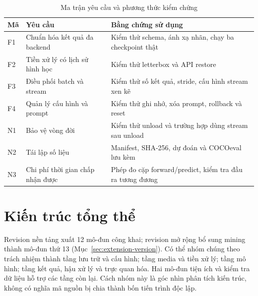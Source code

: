 \begin{table}[H]\centering\small
\caption{Ma trận yêu cầu và phương thức kiểm chứng}
\begin{tabularx}{\textwidth}{p{1.3cm}YY}
\toprule Mã & Yêu cầu & Bằng chứng sử dụng \\\midrule
F1 & Chuẩn hóa kết quả đa backend & Kiểm thử schema, ánh xạ nhãn, chạy ba checkpoint thật \\
F2 & Tiền xử lý có lịch sử hình học & Kiểm thử letterbox và API restore \\
F3 & Điều phối batch và stream & Kiểm thử số kết quả, stride, cấu hình stream xen kẽ \\
F4 & Quản lý cấu hình và prompt & Kiểm thử ghi nhớ, xóa prompt, rollback và reset \\
N1 & Bảo vệ vòng đời & Kiểm thử unload và trường hợp dùng stream sau unload \\
N2 & Tái lập số liệu & Manifest, SHA-256, dự đoán và COCOeval lưu kèm \\
N3 & Chi phí thời gian chấp nhận được & Phép đo cặp forward/predict, kiểm tra đầu ra tương đương \\
\bottomrule
\end{tabularx}
\end{table}

\section{Kiến trúc tổng thể}
Revision nền tảng xuất 12 mô-đun công khai; revision mở rộng bổ sung mining thành mô-đun thứ 13 (Mục~\ref{sec:extension-version}). Có thể nhóm chúng theo trách nhiệm thành tầng lưu trữ và cấu hình; tầng media và tiền xử lý; tầng mô hình; tầng kết quả, hậu xử lý và trực quan hóa. Hai mô-đun tiện ích và kiểm tra dữ liệu hỗ trợ các tầng còn lại. Cách nhóm này là góc nhìn phân tích kiến trúc, không có nghĩa mã nguồn bị chia thành bốn tiến trình độc lập.

